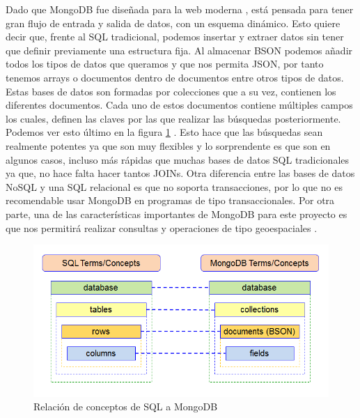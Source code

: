 Dado que MongoDB fue diseñada para la web moderna \cite{Mng-2}, está pensada para tener gran flujo de entrada y salida de datos, con un esquema dinámico. Esto quiere decir que, frente al SQL tradicional, podemos insertar y extraer datos sin tener que definir previamente una estructura fija. Al almacenar BSON podemos añadir todos los tipos de datos que queramos y que nos permita JSON, por tanto tenemos arrays o documentos dentro de documentos entre otros tipos de datos. Estas bases de datos son formadas por colecciones que a su vez, contienen los diferentes documentos. Cada uno de estos documentos contiene múltiples campos los cuales, definen las claves por las que realizar las búsquedas posteriormente. Podemos ver esto último en la figura \ref{Mng-img-1} \cite{Mng-5}. Esto hace que las búsquedas sean realmente potentes ya que son muy flexibles y lo sorprendente es que son en algunos casos, incluso más rápidas que muchas bases de datos SQL tradicionales ya que, no hace falta hacer tantos JOINs. Otra diferencia entre las bases de datos NoSQL y una SQL relacional es que no soporta transacciones, por lo que no es recomendable usar MongoDB en programas de tipo transaccionales. Por otra parte, una de las características importantes de MongoDB para este proyecto es que nos permitirá realizar consultas y operaciones de tipo geoespaciales \cite{Mng-3}.


\begin{figure}[htp]
\centering
\includegraphics[scale=0.57]{Imagenes/mongo1.png}
\caption{Relación de conceptos de SQL a MongoDB}
\label{Mng-img-1}
\end{figure}


